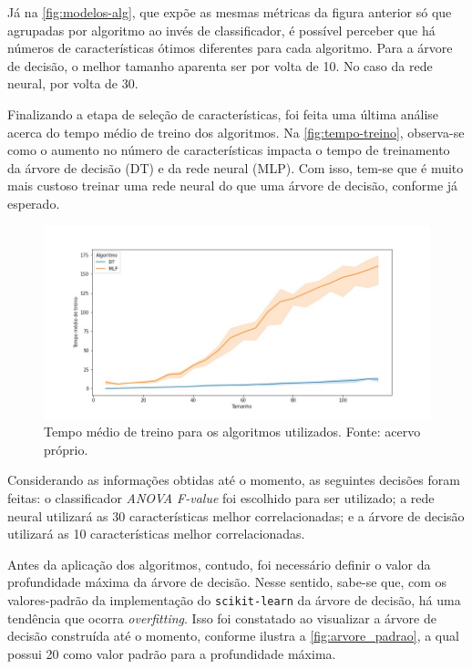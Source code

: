\documentclass[12pt]{article}
\begin{document}
Já na  \autoref{fig:modelos-alg}, que expõe as mesmas métricas da figura anterior só que agrupadas por algoritmo ao invés de classificador, é possível perceber que há números de características ótimos diferentes para cada algoritmo. Para a árvore de decisão, o melhor tamanho aparenta ser por volta de 10. No caso da rede neural, por volta de 30.

Finalizando a etapa de seleção de características, foi feita uma última análise acerca do tempo médio de treino dos algoritmos. Na  \autoref{fig:tempo-treino}, observa-se como o aumento no número de características impacta o tempo de treinamento da árvore de decisão (DT) e da rede neural (MLP). Com isso, tem-se que é muito mais custoso treinar uma rede neural do que uma árvore de decisão, conforme já esperado. 

\begin{figure}[t!]
    \includegraphics[width=\linewidth]{figures/tempo_treino}
    \caption{Tempo médio de treino para os algoritmos utilizados. Fonte: acervo próprio.}
    \label{fig:tempo-treino}
\end{figure}

Considerando as informações obtidas até o momento, as seguintes decisões foram feitas: o classificador \textit{ANOVA F-value} foi escolhido para ser utilizado; a rede neural utilizará as 30 características melhor correlacionadas; e a árvore de decisão utilizará as 10 características melhor correlacionadas.

Antes da aplicação dos algoritmos, contudo, foi necessário definir o valor da profundidade máxima da árvore de decisão. Nesse sentido, sabe-se que, com os valores-padrão da implementação do \texttt{scikit-learn} da árvore de decisão, há uma tendência que ocorra \textit{overfitting}. Isso foi constatado ao visualizar a árvore de decisão construída até o momento, conforme ilustra a \autoref{fig:arvore_padrao}, a qual possui 20 como valor padrão para a profundidade máxima.
\end{document}
